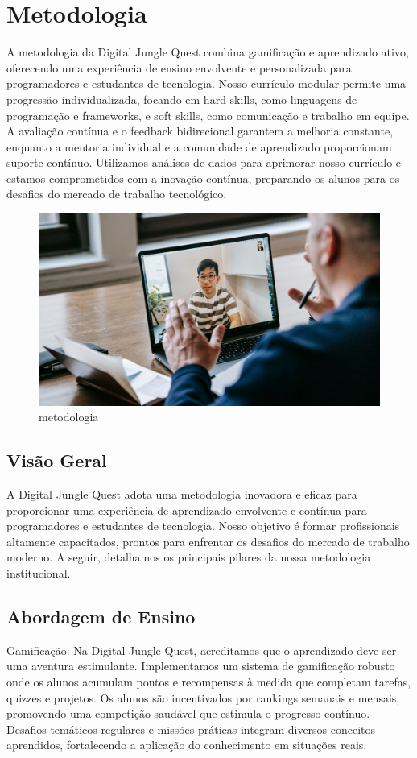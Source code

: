 \chapter{Metodologia}
\label{ch:identificador}
\begin{resumocapitulo}
    A metodologia da Digital Jungle Quest combina gamificação e aprendizado ativo, oferecendo uma experiência de ensino envolvente e personalizada para programadores e estudantes de tecnologia. Nosso currículo modular permite uma progressão individualizada, focando em hard skills, como linguagens de programação e frameworks, e soft skills, como comunicação e trabalho em equipe. A avaliação contínua e o feedback bidirecional garantem a melhoria constante, enquanto a mentoria individual e a comunidade de aprendizado proporcionam suporte contínuo. Utilizamos análises de dados para aprimorar nosso currículo e estamos comprometidos com a inovação contínua, preparando os alunos para os desafios do mercado de trabalho tecnológico.
\end{resumocapitulo}

\begin{figure}
    \centering
    \includegraphics[width=0.75\linewidth]{figuras/metodologia.jpg}
    \caption{metodologia}
    \label{fig:enter-label}
\end{figure}

\section{Visão Geral}
A Digital Jungle Quest adota uma metodologia inovadora e eficaz para proporcionar uma experiência de aprendizado envolvente e contínua para programadores e estudantes de tecnologia. Nosso objetivo é formar profissionais altamente capacitados, prontos para enfrentar os desafios do mercado de trabalho moderno. A seguir, detalhamos os principais pilares da nossa metodologia institucional.

\section{Abordagem de Ensino}
\label{sec:Abordagem de Ensino}
Gamificação:
Na Digital Jungle Quest, acreditamos que o aprendizado deve ser uma aventura estimulante. Implementamos um sistema de gamificação robusto onde os alunos acumulam pontos e recompensas à medida que completam tarefas, quizzes e projetos. Os alunos são incentivados por rankings semanais e mensais, promovendo uma competição saudável que estimula o progresso contínuo. Desafios temáticos regulares e missões práticas integram diversos conceitos aprendidos, fortalecendo a aplicação do conhecimento em situações reais.

